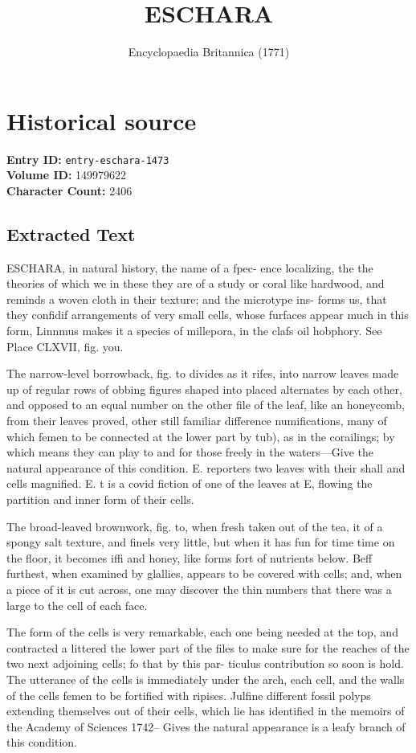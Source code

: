 \documentclass{article}
\title{ESCHARA}
\date{Encyclopaedia Britannica (1771)}
\begin{document}
\maketitle

\section*{Historical source}
\textbf{Entry ID:} \texttt{entry-eschara-1473} \\
\textbf{Volume ID:} 149979622 \\
\textbf{Character Count:} 2406

\subsection*{Extracted Text}
ESCHARA, in natural history, the name of a fpec-
ence localizing, the the theories of which we in these
they are of a study or coral like hardwood, and reminds
a woven cloth in their texture; and the microtype ins-
forms us, that they confidif arrangements of very
small cells, whose furfaces appear much in this form, Linnmus makes it a species of millepora, in the clafs
oil hobphory. See Place CLXVII, fig. you.

The narrow-level borrowback, fig. to divides as it
rifes, into narrow leaves made up of regular rows of
obbing figures shaped into placed alternates by each
other, and opposed to an equal number on the other
file of the leaf, like an honeycomb, from their leaves
proved, other still familiar difference numifications,
many of which femen to be connected at the lower part
by tub), as in the corailings; by which means they
can play to and for those freely in the waters—Give
the natural appearance of this condition. E. reporters
two leaves with their shall and cells magnified. E. t
is a covid fiction of one of the leaves at E, flowing the
partition and inner form of their cells.

The broad-leaved brownwork, fig. to, when fresh
taken out of the tea, it of a spongy salt texture, and
finels very little, but when it has fun for time time
on the floor, it becomes iffi and honey, like forms fort
of nutrients below. Beff furthest, when examined by
glallies, appears to be covered with cells; and, when a
piece of it is cut across, one may discover the thin
numbers that there was a large to the cell of each face.

The form of the cells is very remarkable, each
one being needed at the top, and contracted a littered
the lower part of the files to make sure for the reaches
of the two next adjoining cells; fo that by this par-
ticulus contribution so soon is hold. The utterance
of the cells is immediately under the arch, each cell,
and the walls of the cells femen to be fortified with
ripises. Julfine different fossil polyps extending
themselves out of their cells, which lie has identified
in the memoirs of the Academy of Sciences 1742--
Gives the natural appearance is a leafy branch of
this condition.
\end{document}
